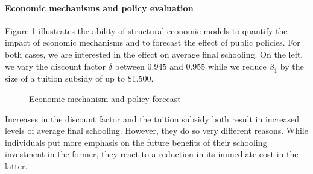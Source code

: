 \paragraph{Economic mechanisms and policy evaluation} Figure \ref{Economic mechanism and policy forecast} illustrates the ability of structural economic models to quantify the impact of economic mechanisms and to forecast the effect of public policies. For both cases, we are interested in the effect on average final schooling. On the left, we vary the discount factor $\delta$ between $0.945$ and $0.955$ while we reduce $\beta_1$ by the size of a tuition subsidy of up to \$1.500.

\begin{figure}[h!]\centering
\caption{Economic mechanism and policy forecast}\label{Economic mechanism and policy forecast}
\hspace{0.3cm}
\end{figure}\FloatBarrier

\noindent Increases in the discount factor and the tuition subsidy both result in increased levels of average final schooling. However, they do so very different reasons. While individuals put more emphasis on the future benefits of their schooling investment in the former, they react to a reduction in its immediate cost in the latter.
